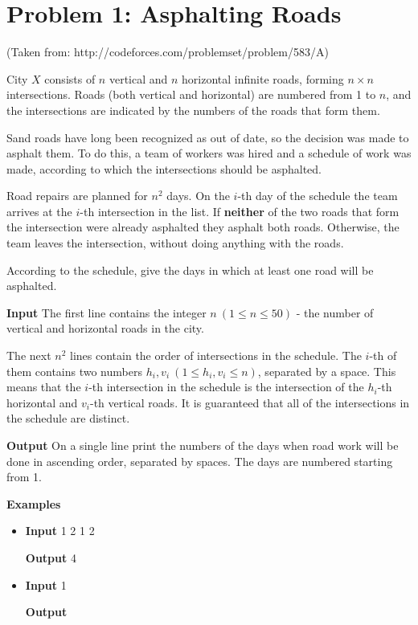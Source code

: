 \normalfont\documentclass[letterpaper,11pt]{article}
\begin{document}
\section*{Problem 1: Asphalting Roads}
(Taken from: http://codeforces.com/problemset/problem/583/A)

City $X$ consists of $n$ vertical and $n$ horizontal infinite roads, forming $n \times n$ intersections. Roads (both vertical and horizontal) are numbered from 1 to $n$, and the intersections are indicated by the numbers of the roads that form them.

Sand roads have long been recognized as out of date, so the decision was made to asphalt them. To do this, a team of workers was hired and a schedule of work was made, according to which the intersections should be asphalted.

Road repairs are planned for $n^2$ days. On the $i$-th day of the schedule the team arrives at the $i$-th intersection in the list. If \textbf{neither} of the two roads that form the intersection were already asphalted they asphalt both roads. Otherwise, the team leaves the intersection, without doing anything with the roads.

According to the schedule, give the days in which at least one road will be asphalted.

\textbf{Input} \newline
The first line contains the integer $n \ (1 \leq n \leq 50)$ - the number of vertical and horizontal roads in the city.

The next $n^2$ lines contain the order of intersections in the schedule. The $i$-th of them contains two numbers $h_i, v_i \ (1 \leq h_i, v_i \leq n)$, separated by a space. This means that the $i$-th intersection in the schedule is the intersection of the $h_i$-th horizontal and $v_i$-th vertical roads. It is guaranteed that all of the intersections in the schedule are distinct.

\textbf{Output} \newline
On a single line print the numbers of the days when road work will be done in ascending order, separated by spaces. The days are numbered starting from 1.

\textbf{Examples}
\begin{itemize}
\item \textbf{Input}   1  2  1  2

\textbf{Output}  4

\item \textbf{Input}   1

\textbf{Output} 
\end{itemize}
\end{document}
